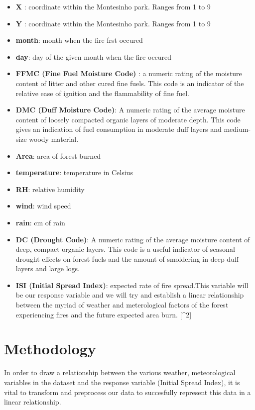 \documentclass[conference,final,]{IEEEtran}
\begin{document}
\begin{itemize}
\item
  \textbf{X} : coordinate within the Montesinho park. Ranges from 1 to 9
\item
  \textbf{Y} : coordinate within the Montesinho park. Ranges from 1 to 9
\item
  \textbf{month}: month when the fire frst occured 
\item
  \textbf{day}: day of the given month when the fire occured 
\item
  \textbf{FFMC (Fine Fuel Moisture Code)} : a numeric rating of the
  moisture content of litter and other cured fine fuels. This code is an
  indicator of the relative ease of ignition and the flammability of
  fine fuel. 
\item
  \textbf{DMC (Duff Moisture Code)}: A numeric rating of the average
  moisture content of loosely compacted organic layers of moderate
  depth. This code gives an indication of fuel consumption in moderate
  duff layers and medium-size woody material. 
\item
  \textbf{Area}: area of forest burned 
\item
  \textbf{temperature}: temperature in Celsius 
\item
  \textbf{RH}: relative humidity 
\item
  \textbf{wind}: wind speed 
\item
  \textbf{rain}: cm of rain 
\item
  \textbf{DC (Drought Code)}: A numeric rating of the average moisture
  content of deep, compact organic layers. This code is a useful
  indicator of seasonal drought effects on forest fuels and the amount
  of smoldering in deep duff layers and large logs. 
\item
  \textbf{ISI (Initial Spread Index)}: expected rate of fire spread.This
  variable will be our response variable and we will try and establish a
  linear relationship between the myriad of weather and meterological
  factors of the forest experiencing fires and the future expected area
  burn. {[}\^{}2{]} 
\end{itemize}

\hypertarget{methodology}{%
\section{Methodology}\label{methodology}}

In order to draw a relationship between the various weather,
meteorological variables in the dataset and the response variable
(Initial Spread Index), it is vital to transform and preprocess our data
to succesfully represent this data in a linear relationship.
\end{document}
